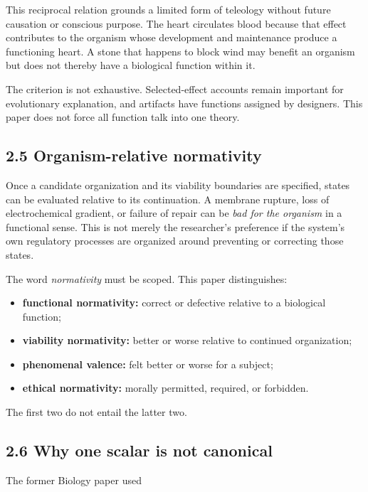\documentclass[
  11pt,
]{article}
\providecommand{\tightlist}{%
  \setlength{\itemsep}{0pt}\setlength{\parskip}{0pt}}
\begin{document}
This reciprocal relation grounds a limited form of teleology without
future causation or conscious purpose. The heart circulates blood
because that effect contributes to the organism whose development and
maintenance produce a functioning heart. A stone that happens to block
wind may benefit an organism but does not thereby have a biological
function within it.

The criterion is not exhaustive. Selected-effect accounts remain
important for evolutionary explanation, and artifacts have functions
assigned by designers. This paper does not force all function talk into
one theory.

\subsection{2.5 Organism-relative
normativity}\label{organism-relative-normativity}

Once a candidate organization and its viability boundaries are
specified, states can be evaluated relative to its continuation. A
membrane rupture, loss of electrochemical gradient, or failure of repair
can be \emph{bad for the organism} in a functional sense. This is not
merely the researcher's preference if the system's own regulatory
processes are organized around preventing or correcting those states.

The word \emph{normativity} must be scoped. This paper distinguishes:

\begin{itemize}
\tightlist
\item
  \textbf{functional normativity:} correct or defective relative to a
  biological function;
\item
  \textbf{viability normativity:} better or worse relative to continued
  organization;
\item
  \textbf{phenomenal valence:} felt better or worse for a subject;
\item
  \textbf{ethical normativity:} morally permitted, required, or
  forbidden.
\end{itemize}

The first two do not entail the latter two.

\subsection{2.6 Why one scalar is not
canonical}\label{why-one-scalar-is-not-canonical}

The former Biology paper used
\end{document}
